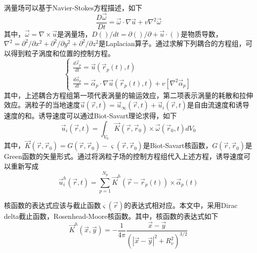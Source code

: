 涡量场可以基于Navier-Stokes方程描述，如下
\begin{equation}
    \frac{{D\vec \omega }}{{Dt}} = \vec \omega  \cdot \nabla \vec u + v{\nabla ^2}\vec \omega 
\end{equation}
其中，$\vec \omega  = \nabla  \times \vec u$是涡量场，$D\left( {} \right)/dt = \partial \left( {} \right)/\partial  + \vec u \cdot \left( {} \right)$是物质导数，${\nabla ^2} = {\partial ^2}/\partial {x^2} + {\partial ^2}/\partial {y^2} + {\partial ^2}/\partial {z^2}$是Laplacian算子。通过求解下列耦合的方程组，可以得到粒子涡度和位置的控制方程。
\begin{equation}
    \left\{ \begin{array}{l}
        \frac{{d{{\vec r}_p}}}{{dt}} = \vec u\left( {{{\vec r}_p}\left( t \right),t} \right)\\
        \frac{{d{{\vec \alpha }_p}}}{{dt}} = {{\vec \alpha }_p} \cdot \nabla \vec u\left( {{{\vec r}_p}\left( t \right),t} \right) + v\left[ {{\nabla ^2}{{\vec \alpha }_p}} \right]
        \end{array} \right.
    \label{equation:chap_2_5_1_1}
\end{equation}
其中，上述耦合方程组第一项代表涡量的输运效应，第二项表示涡量的耗散和拉伸效应。涡粒子的当地速度$\vec u\left( {\vec r,t} \right) = {\vec u_\infty }\left( {\vec r,t} \right) + {\vec u_i}\left( {\vec r,t} \right)$是自由流速度和诱导速度的和。诱导速度可以通过Biot-Savart理论求得，如下
\begin{equation}
    {\vec u_i}\left( {\vec r,t} \right) = \int_{{V_0}} {\vec K\left( {\vec r,{{\vec r}_0}} \right)}  \times \vec \omega \left( {{{\vec r}_0},t} \right)d{V_0}
\end{equation}
其中，$\vec K\left( {\vec r,{{\vec r}_0}} \right) = G\left( {\vec r,{{\vec r}_0}} \right) - \varsigma \left( {\vec r,{{\vec r}_0}} \right)$是Biot-Savart核函数，$G\left( {\vec r,{{\vec r}_0}} \right)$是Green函数的矢量形式。通过将涡粒子场的控制方程组代入上述方程，诱导速度可以重新写成
\begin{equation}
    \vec u_i^h\left( {\vec r,t} \right) = \sum\limits_{p = 1}^{{N_p}} {{{\vec K}^h}\left( {\vec r - {{\vec r}_p}\left( t \right)} \right) \times {{\vec \alpha }_p}\left( t \right)} 
\end{equation}

核函数的表达式应该与截止函数$\varsigma \left( {\vec r} \right)$的表达式相对应。本文中，采用Dirac delta截止函数，Rosenhead-Moore核函数。其中，核函数的表达式如下
\begin{equation}
    {\vec K^h}\left( {\vec x,\vec y} \right) =  - \frac{1}{{4\pi }}\frac{{\vec x - \vec y}}{{{{\left( {{{\left| {\vec x - \vec y} \right|}^2} + R_v^2} \right)}^{3/2}}}}
\end{equation}

